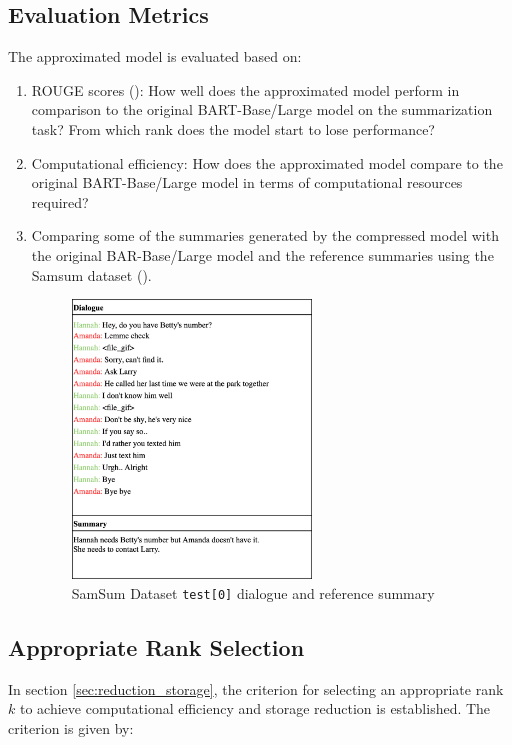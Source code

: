         
        
    \subsection{Evaluation Metrics}\label{sec:evaluation_metrics}
        The approximated model is evaluated based on:
        \begin{enumerate}
        \item ROUGE scores (\cite{lin-2004-rouge}): How well does the approximated model perform in comparison to the original BART-Base/Large model on the summarization task? From which rank does the model start to lose performance?
        \item Computational efficiency: How does the approximated model compare to the original BART-Base/Large model in terms of computational resources required?
        \item Comparing some of the summaries generated by the compressed model with the original BAR-Base/Large model and the reference summaries using the Samsum dataset (\cite{gliwa-etal-2019-samsum}).
        \begin{figure}[H]
            \centering
            \includegraphics[width=0.6\textwidth]{figs/dialogue.png}
            \caption{SamSum Dataset \texttt{test[0]} dialogue and reference summary}
            \label{fig:SamSum_Example}
        \end{figure}
        \end{enumerate}

        \subsection{Appropriate Rank Selection}
            In section \ref{sec:reduction_storage}, the criterion for selecting an appropriate rank \(k\) to achieve computational efficiency and storage reduction is established. The criterion is given by:
            
